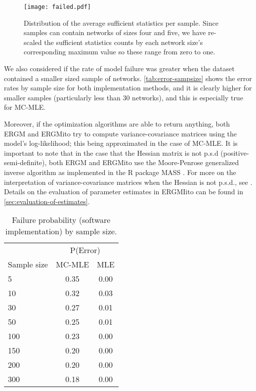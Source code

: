 \documentclass[12pt]{article}
\begin{document}
\begin{figure}
	\centering
	\caption{\label{fig:failed}Distribution of the average sufficient statistics per sample. Since samples can contain networks of sizes four and five, we have re-scaled the sufficient statistics counts by each network size's corresponding maximum value so these range from zero to one.}
	\texttt{[image: failed.pdf]}
\end{figure}

We also considered if the rate of model failure was greater when the dataset contained a smaller sized sample of networks. \autoref{tab:error-sampsize} shows the error rates by sample size for both implementation methods, and it is clearly higher for smaller samples (particularly less than 30 networks), and this is especially true for MC-MLE. 

Moreover, if the optimization algorithms are able to return anything, both ERGM and ERGMito try to compute variance-covariance matrices using the model's log-likelihood; this being approximated in the case of MC-MLE. It is important to note that in the case that the Hessian matrix is not p.s.d (positive-semi-definite), both ERGM and ERGMito use the Moore-Penrose generalized inverse algorithm as implemented in the R package MASS \cite{Venables2002}. For more on the interpretation of variance-covariance matrices when the Hessian is not p.s.d., see \cite{Gill2004}. Details on the evaluation of parameter estimates in ERGMIito can be found in \autoref{sec:evaluation-of-estimates}.

\begin{table}[ht]
	\centering
	\begin{tabular}{lcc}
		\toprule & \multicolumn{2}{c}{P(Error)} \\ \cmidrule(r){2-3}
		Sample size & MC-MLE & MLE \\ 
		\midrule
		5 & 0.35 & 0.00 \\ 
		10 & 0.32 & 0.03 \\ 
		30 & 0.27 & 0.01 \\ 
		50 & 0.25 & 0.01 \\ 
		100 & 0.23 & 0.00 \\ 
		150 & 0.20 & 0.00 \\ 
		200 & 0.20 & 0.00 \\ 
		300 & 0.18 & 0.00 \\ 
		\bottomrule
	\end{tabular}
	\caption{\label{tab:error-sampsize}Failure probability (software implementation) by sample size.} 
\end{table}
\end{document}
